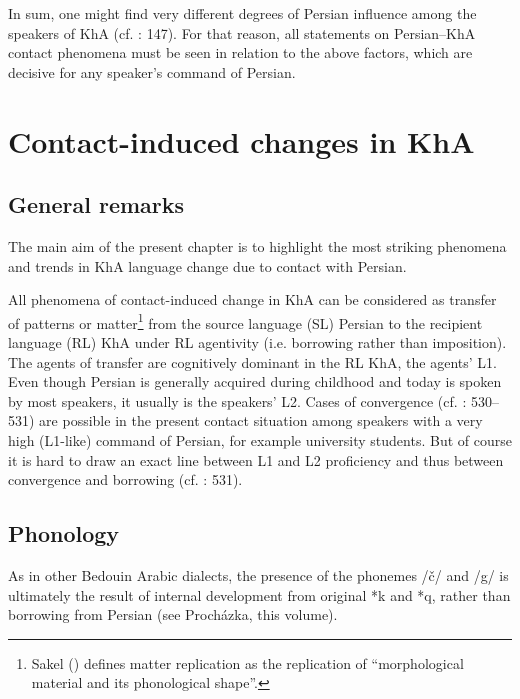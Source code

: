 \documentclass[output=paper,nonflat]{langsci/langscibook}
\begin{document}
In sum, one might find very different degrees of Persian influence among the speakers of KhA (cf. \citealt{MatrasShabibi2007}: 147). For that reason, all statements on Persian–KhA contact phenomena must be seen in relation to the above factors, which are decisive for any speaker’s command of Persian. 


\section{Contact-induced changes in KhA} 
\subsection{General remarks\footnotemark}
The main aim of the present chapter is to highlight the most striking phenomena and trends in KhA language change due to contact with Persian.


All phenomena of contact-induced change in KhA can be considered as transfer of patterns or matter\footnote{Sakel (\citeyear[15]{Sakel2007}) defines matter replication as the replication of “morphological material and its phonological shape”.} from the source language (SL) Persian to the recipient language (RL) KhA under RL agentivity (i.e. borrowing rather than imposition).{} The agents of transfer are cognitively dominant in the RL KhA, the agents’ L1. Even though Persian is generally acquired during childhood and today is spoken by most speakers, it usually is the speakers’ L2. Cases of convergence (cf. \citealt{Lucas2015}: 530–531) are possible in the present contact situation among speakers with a very high (L1-like) command of Persian, for example university students. But of course it is hard to draw an exact line between L1 and L2 proficiency and thus between convergence and borrowing (cf. \citealt{Lucas2015}: 531). 



\subsection{Phonology}
As in other Bedouin Arabic dialects, the presence of the phonemes /č/ and /g/ is ultimately the result of internal development from original *k and *q, rather than borrowing from Persian (see Procházka, this volume).
\end{document}
